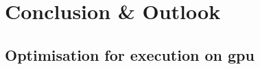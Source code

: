 \chapter{Conclusion \& Outlook}
\label{chap:conclusion}


\section{Optimisation for execution on \ac{gpu} }